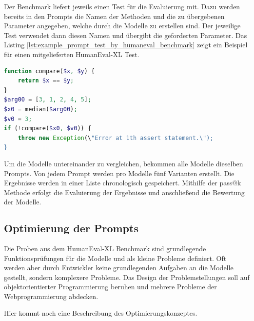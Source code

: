 Der Benchmark liefert jeweils einen Test für die Evaluierung mit. Dazu werden bereits in den Prompts die Namen der Methoden und die zu übergebenen Parameter angegeben, welche durch die Modelle zu erstellen sind. Der jeweilige Test verwendet dann diesen Namen und übergibt die geforderten Parameter. Das Listing \ref{lst:example_prompt_test_by_humaneval_benchmark} zeigt ein Beispiel für einen mitgelieferten HumanEval-XL Test.\vspace{0.2cm}

\begin{lstlisting}[language=php,caption={Beispiel für einen Test aus dem HumanEval-XL Benchmark},label=lst:example_prompt_test_by_humaneval_benchmark]
function compare($x, $y) {
	return $x == $y;
}
$arg00 = [3, 1, 2, 4, 5];
$x0 = median($arg00);
$v0 = 3;
if (!compare($x0, $v0)) {
	throw new Exception(\"Error at 1th assert statement.\");
}
\end{lstlisting}


Um die Modelle untereinander zu vergleichen, bekommen alle Modelle dieselben Prompts. Von jedem Prompt werden pro Modelle fünf Varianten erstellt. Die Ergebnisse werden in einer Liste chronologisch gespeichert. Mithilfe der pass@k Methode erfolgt die Evaluierung der Ergebnisse und anschließend die Bewertung der Modelle.\vspace{0.2cm}

\subsection{Optimierung der Prompts}
Die Proben aus dem HumanEval-XL Benchmark sind grundlegende Funktionsprüfungen für die Modelle und als kleine Probleme definiert. Oft werden aber durch Entwickler keine grundlegenden Aufgaben an die Modelle gestellt, sondern komplexere Probleme. Das Design der Problemstellungen soll auf objektorientierter Programmierung beruhen und mehrere Probleme der Webprogrammierung abdecken.

\begin{tcolorbox}[
	enhanced,
	colback=red!5!white,
	colframe=red!75!black!50,
	title= Mein roter Faden
	]
	Hier kommt noch eine Beschreibung des Optimierungskonzeptes.
\end{tcolorbox}

